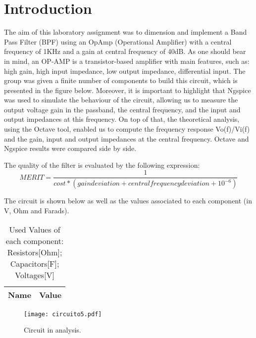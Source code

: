\section{Introduction}
\label{introduction}


\par The aim of this laboratory assignment was to dimension and implement a Band Pass Filter (BPF) using an OpAmp (Operational Amplifier) with a central frequency of 1KHz and a gain at central frequency of 40dB. As one should bear in mind, an OP-AMP is a transistor-based amplifier with main features, such as: high gain, high input impedance, low output impedance, differential input. The group was given a finite number of components to build this circuit, which is presented in the figure below. Moreover, it is important to highlight that Ngspice was used to simulate the behaviour of the circuit, allowing us to measure the output voltage gain in the passband, the central frequency, and the input and output impedances at this frequency. On top of that, the theoretical analysis, using the Octave tool, enabled us to compute the frequency response Vo(f)/Vi(f) and the gain, input and output impedances at the central frequency. Octave and Ngspice results were compared side by side.

\par The quality of the filter is evaluated by the following expression:
\begin {equation}
	 MERIT = \frac{1}{cost * (gain deviation + central frequency deviation + 10^{-6})}   	
	\label{merit}
\end{equation}

The circuit is shown below as well as the values associated to each component (in V, Ohm and Farads).


\begin{table}[ht]
  \centering
  \begin{tabular}{|l|r|}
    \hline    
    {\bf Name} & {\bf Value} \\ \hline
    
  \end{tabular}
  \caption{Used Values of each component: Resistors[Ohm]; Capacitors[F]; Voltages[V]}
  \label{tab:3}
\end{table}



\begin{figure}[ht] \centering
\texttt{[image: circuito5.pdf]}
\caption{Circuit in analysis.}
\label{circuito todo}
\end{figure}




\newpage


